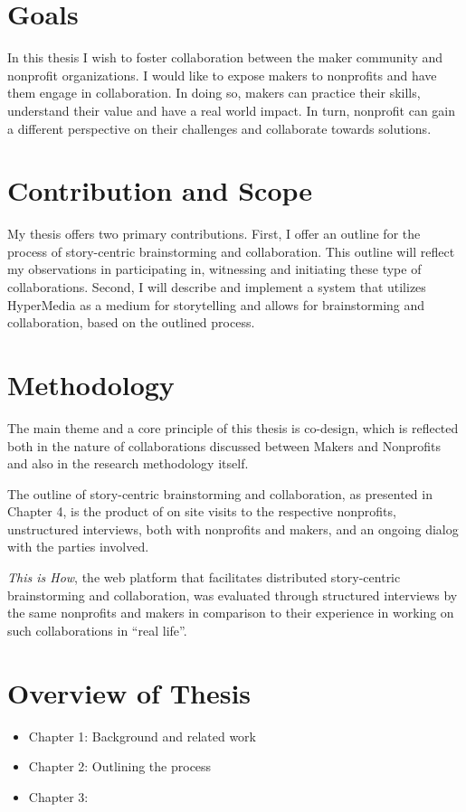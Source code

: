 \section{Goals}
In this thesis I wish to foster collaboration between the maker community and nonprofit organizations. I would like to expose makers to nonprofits and have them engage in collaboration. In doing so, makers can practice their skills, understand their value and have a real world impact. In turn, nonprofit can gain a different perspective on their challenges and collaborate towards solutions. 

\section{Contribution and Scope}
My thesis offers two primary contributions. First, I offer an outline for the process of story-centric brainstorming and collaboration. This outline will reflect my observations in participating in, witnessing and initiating these type of collaborations. Second, I will describe and implement a system that utilizes HyperMedia as a medium for storytelling and allows for brainstorming and collaboration, based on the outlined process. 

\section{Methodology} 
The main theme and a core principle of this thesis is co-design, which is reflected both in the nature of collaborations discussed between Makers and Nonprofits and also in the research methodology itself. 

The outline of story-centric brainstorming and collaboration, as presented in Chapter 4, is the product of on site visits to the respective nonprofits, unstructured interviews, both with nonprofits and makers, and an ongoing dialog with the parties involved. 

\textit{This is How}, the web platform that facilitates distributed story-centric brainstorming and collaboration, was evaluated through structured interviews by the same nonprofits and makers in comparison to their experience in working on such collaborations in ``real life''. 
\section{Overview of Thesis}
\begin{itemize}
\item Chapter 1: Background and related work
\item Chapter 2: Outlining the process
\item Chapter 3: 
\end{itemize}
